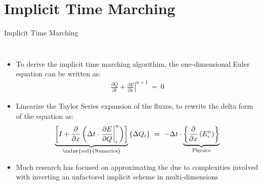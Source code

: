 \section{Implicit Time Marching}
\begin{frame}{Implicit Time Marching}
  \begin{columns}
    \begin{itemize}
      \item To derive the implicit time marching algorithim, the one-dimensional Euler equation 
            can be written as:
 			\begin{equation}
				\begin{split}
					\label{eq:Implicit_Scheme}
  					\frac{\partial{Q}}{\partial{t}}
            +\left.\frac{\partial{E}}{\partial{x}}\right|^{n+1}~=~0
				\end{split}
			\end{equation}
      \item Linearize the Taylor Series expansion of the fluxes, to rewrite the delta form of the
            equation as:
      \begin{equation}
        \underbrace{\left[I+\frac{\partial}{\partial{x}}\left(\Delta{t}\cdot
        \left.\frac{\partial{E}}{\partial{Q}}\right|_{i}^n
        \right)\right]}_{\text{{\color{red}{Numerics}}}}\left\{\Delta{Q_{i}}\right\}~=~
        -\Delta{t}\cdot
        \underbrace{\left\{\frac{\partial}{\partial{x}}\left(E_{i}^n
        \right)\right\}}_{\text{Physics}}            
      \end{equation}
    \item Much research has focused on approximating the {\color{red}{Numerics}} due to complexities involved
        with inverting an unfactored implicit scheme in multi-dimensions
    \end{itemize}   
  \end{columns}
\end{frame}

